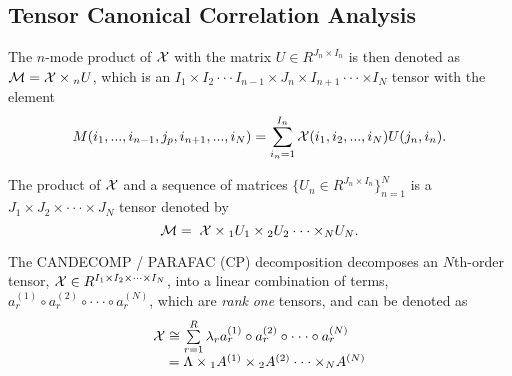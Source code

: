 \documentclass{sig-alternate-05-2015}
\begin{document}
\subsection{Tensor Canonical Correlation Analysis}
The $n$-mode product of ${\cal X}$ with the matrix $U \in {R^{{J_n} \times {I_n}}}$ is then denoted as ${\cal M} = {\cal X} \times {}_nU$, which is an ${I_1} \times {I_2} \cdot  \cdot  \cdot {I_{n - 1}} \times {J_n} \times {I_{n + 1}} \cdot  \cdot  \cdot  \times {I_N}$ tensor with the element
\begin{equation}\label{}
M({i_1},...,{i_{n - 1}},{j_p},{i_{n + 1}},...,{i_N})= \sum\limits_{{i_n} = 1}^{{I_n}} {{\cal X}({i_1},{i_2},...,{i_N})U({j_n},{i_n})}.
\end{equation}









The product of ${\cal X}$ and a sequence of matrices $\{ {U_n} \in {R^{{J_n} \times {I_n}}}\} _{n = 1}^N$ is a ${J_1} \times {J_2} \times  \cdot  \cdot  \cdot  \times {J_N}$ tensor denoted by
\begin{equation}\label{}
{\cal M} = \;{\cal X} \times {}_1{U_1} \times {}_2{U_2} \cdot  \cdot  \cdot  \times {}_N{U_N}.
\end{equation}



The CANDECOMP / PARAFAC (CP) decomposition decomposes an $N$th-order tensor, ${\cal X} \in {R^{{I_1} \times {I_2} \times  \cdot  \cdot  \cdot  \times {I_N}}}$, into a linear combination of terms, $a_r^{(1)} \circ a_r^{(2)} \circ  \cdot  \cdot  \cdot  \circ a_r^{(N)}$, which are {\em rank} {\em one} tensors, and can be denoted as
\begin{equation}\label{}
\begin{array}{l}
{\cal X} \cong \sum\limits_{r = 1}^R {{\lambda _r}a_r^{(1)} \circ a_r^{(2)} \circ  \cdot  \cdot  \cdot  \circ a_r^{(N)}} \\
\;\;\;\; = \Lambda  \times {}_1{A^{(1)}} \times {}_2{A^{(2)}} \cdot  \cdot  \cdot  \times {}_N{A^{(N)}}\\
\end{array}
\end{equation}
\end{document}
